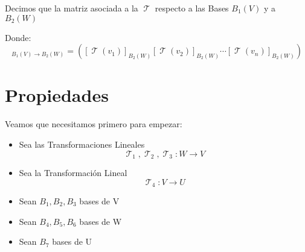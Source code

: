 \documentclass[12pt]{report}                                %
\DeclareMathOperator \LinealTransformation {\mathcal{T}}
\begin{document}
        Decimos que la matriz asociada a la $\LinealTransformation$ respecto a las Bases 
        $B_{1}(V)$ y a $B_{2}(W)$

        Donde:
        \begin{equation*}
            [\LinealTransformation]_{B_{1}(V) \to B_{2}(W)} = 
            \left(
                [\LinealTransformation(v_1)]_{B_{2}(W)}
                [\LinealTransformation(v_2)]_{B_{2}(W)}
                \cdots
                [\LinealTransformation(v_n)]_{B_{2}(W)}
            \right)
        \end{equation*}


        \clearpage
        \section{Propiedades}

            Veamos que necesitamos primero para empezar:
            
            \begin{itemize}
                \item Sea las Transformaciones Lineales 
                    $$\LinealTransformation_1, \LinealTransformation_2, \LinealTransformation_3 : W \to V$$
                
                \item Sea la Transformación Lineal $$\LinealTransformation_4: V \to U$$
                
                \item Sean $B_1, B_2, B_3$ bases de V
                
                \item Sean $B_4, B_5, B_6$ bases de W
                
                \item Sean $B_7$ bases de U
            \end{itemize}
\end{document}
